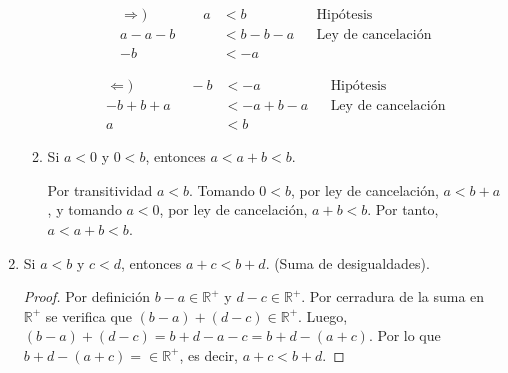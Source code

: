 \documentclass[11pt]{article}
\newcommand{\R}{\mathbb{R}}
\begin{document}
\begin{enumerate}[label=\alph*)]
\begin{enumerate}[label=\roman*)]
\begin{center}
  \begin{minipage}[l]{.5\linewidth}
   \begin{align*}
    \Rightarrow) \qquad \qquad
    a &< b && \text{Hipótesis}\\
    a -a -b &< b -b -a && \text{Ley de cancelación}\\
    -b &< -a%
   \end{align*}
  \end{minipage}%
  \begin{minipage}[r]{.5\linewidth}
   \begin{align*}
    \Leftarrow) \qquad \qquad
    -b &< -a && \text{Hipótesis}\\
    -b + b +a &< -a +b -a && \text{Ley de cancelación}\\
    a &< b &&%
   \end{align*}
  \end{minipage}
  \end{center}
  \item Si $a<0$ y $0<b$, entonces $a<a+b<b$.
  
  Por transitividad $a<b$. Tomando $0<b$, por ley de cancelación, $a<b+a$, y tomando $a<0$, por ley de cancelación, $a+b<b$. Por tanto, $a<a+b<b$.
 \end{enumerate} %



 \item Si $a<b$ y $c < d$, entonces $a+c<b+d$. (Suma de desigualdades).
 \begin{proof} 
 Por definición $b-a\in \R^+$ y $d-c\in \R^+$. Por cerradura de la suma en $\R^+$ se verifica que $(b-a)+(d-c)\in \R^+$. Luego, $(b-a)+(d-c)=b+d-a-c=b+d-(a+c)$. Por lo que $b+d-(a+c)=\in \R^+$, es decir, $a+c<b+d$.
 \end{proof}


\end{enumerate}
\end{document}
